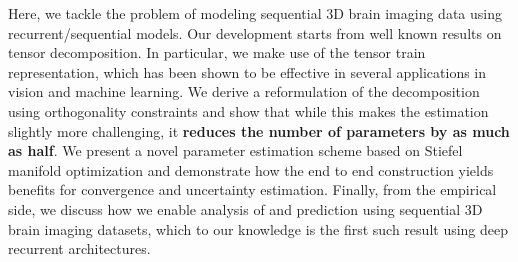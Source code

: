 Here,
we tackle the problem of modeling 
sequential 3D brain imaging data using 
recurrent/sequential models. 
Our development starts from well known results on tensor decomposition. In particular, we 
make use of the tensor train representation, which has been shown to be effective in several 
applications in vision and machine learning. We derive a reformulation of the decomposition using 
orthogonality constraints and show that while this makes the estimation slightly more challenging, 
it \textbf{reduces the number of parameters by as much as half}. 
We present a novel parameter estimation scheme based on Stiefel manifold optimization and demonstrate 
how the end to end construction yields benefits for convergence and uncertainty estimation. 
Finally, from the empirical side, we discuss how we enable analysis of and prediction using sequential 3D brain imaging datasets, which to our knowledge is the first such result using 
deep recurrent architectures. 

















